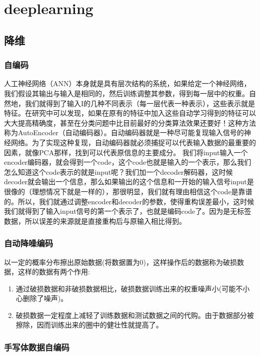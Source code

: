 \chapter{deeplearning}
\section{降维}
\subsection{自编码}
人工神经网络（ANN）本身就是具有层次结构的系统，如果给定一个神经网络，我们假设其输出与输入是相同的，然后训练调整其参数，得到每一层中的权重。自然地，我们就得到了输入I的几种不同表示（每一层代表一种表示），这些表示就是特征。在研究中可以发现，如果在原有的特征中加入这些自动学习得到的特征可以大大提高精确度，甚至在分类问题中比目前最好的分类算法效果还要好！这种方法称为AutoEncoder（自动编码器）。自动编码器就是一种尽可能复现输入信号的神经网络。为了实现这种复现，自动编码器就必须捕捉可以代表输入数据的最重要的因素，就像PCA那样，找到可以代表原信息的主要成分。
我们将input输入一个encoder编码器，就会得到一个code，这个code也就是输入的一个表示，那么我们怎么知道这个code表示的就是input呢？我们加一个decoder解码器，这时候decoder就会输出一个信息，那么如果输出的这个信息和一开始的输入信号input是很像的（理想情况下就是一样的），那很明显，我们就有理由相信这个code是靠谱的。所以，我们就通过调整encoder和decoder的参数，使得重构误差最小，这时候我们就得到了输入input信号的第一个表示了，也就是编码code了。因为是无标签数据，所以误差的来源就是直接重构后与原输入相比得到。
\subsection{自动降噪编码}
以一定的概率分布擦出原始数据(将数据置为0)，这样操作后的数据称为破损数据，这样的数据有两个作用:
\begin{enumerate}
\item 通过破损数据和非破损数据相比，破损数据训练出来的权重噪声小(可能不小心删除了噪声)。
\item 破损数据一定程度上减轻了训练数据和测试数据之间的代购。由于数据部分被擦除，因而训练出来的圈中的健壮性就提高了。
\end{enumerate}
\subsection{手写体数据自编码}

